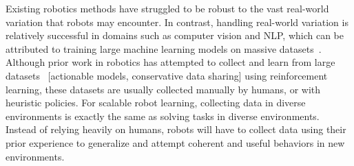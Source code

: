 

Existing robotics methods have struggled to be robust to the vast real-world variation that robots may encounter.
In contrast, handling real-world variation is relatively successful
in domains such as computer vision and NLP, which can be attributed to training large machine learning models on massive datasets~\cite{krizhevsky2012imagenet}.
Although prior work in robotics has attempted to collect and learn from large datasets~\cite{levine2017grasping} [actionable models, conservative data sharing]
using reinforcement learning, these datasets are usually collected manually by humans, or with heuristic policies.
For scalable robot learning, collecting data in diverse environments is exactly the same as solving tasks in diverse environments.
Instead of relying heavily on humans, robots will have to collect data using their prior experience to generalize and attempt coherent and useful behaviors in new environments.

